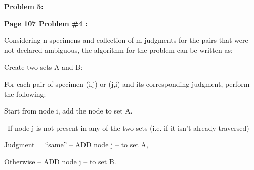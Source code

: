 \documentclass[letterpaper,portrait,12pt]{article}
\begin{document}
\begin{flushleft}

\end{flushleft}


\begin{flushleft}

\end{flushleft}


\begin{flushleft}
\textbf{Problem 5:}
\end{flushleft}


\begin{flushleft}
\textbf{Page 107 Problem \#4 :}
\end{flushleft}


\begin{flushleft}
	Considering n specimens and collection of m judgments for the pairs that were not declared ambiguous, the algorithm for the problem can be written as:
\end{flushleft}


\begin{flushleft}

\end{flushleft}


\begin{flushleft}
Create two sets A and B:
\end{flushleft}


\begin{flushleft}
For each pair of specimen (i,j) or (j,i) and its corresponding judgment, perform the following:
\end{flushleft}


\begin{flushleft}
Start from node i, add the node to set A.
\end{flushleft}


\begin{flushleft}

\end{flushleft}


\begin{flushleft}
	--If node j is not present in any of the two sets (i.e. if it isn't already traversed)
\end{flushleft}


\begin{flushleft}
		Judgment = {``}same'' -- ADD node j -- to set A,
\end{flushleft}


\begin{flushleft}
		Otherwise -- ADD node j -- to set B.
\end{flushleft}
\end{document}
